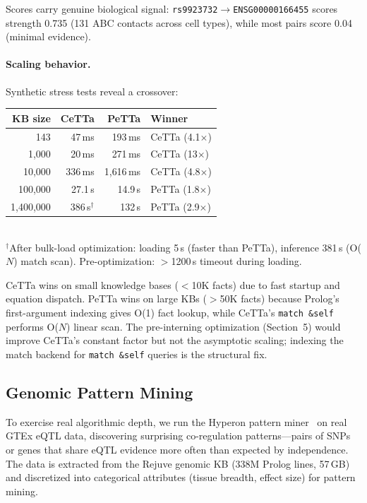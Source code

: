 \documentclass[11pt]{article}
\newcommand{\code}[1]{\texttt{#1}}
\newcommand{\PeTTa}{\textup{PeTTa}}
\newcommand{\CeTTa}{\textup{CeTTa}}
\begin{document}
Scores carry genuine biological signal: \code{rs9923732}$\to$\code{ENSG00000166455}
scores strength 0.735 (131 ABC contacts across cell types), while
most pairs score 0.04 (minimal evidence).

\paragraph{Scaling behavior.}
Synthetic stress tests reveal a crossover:

\begin{center}
\begin{tabular}{rrrl}
\toprule
KB size & \CeTTa{} & \PeTTa{} & Winner \\
\midrule
143        & 47\,ms    & 193\,ms   & \CeTTa{} (4.1$\times$) \\
1{,}000    & 20\,ms    & 271\,ms   & \CeTTa{} (13$\times$) \\
10{,}000   & 336\,ms   & 1{,}616\,ms & \CeTTa{} (4.8$\times$) \\
100{,}000  & 27.1\,s   & 14.9\,s   & \PeTTa{} (1.8$\times$) \\
1{,}400{,}000 & 386\,s$^\dagger$ & 132\,s & \PeTTa{} (2.9$\times$) \\
\bottomrule
\end{tabular}
\smallskip\\
{\footnotesize $^\dagger$After bulk-load optimization: loading 5\,s
(faster than \PeTTa{}), inference 381\,s (O($N$) match scan).
Pre-optimization: $>$1200\,s timeout during loading.}
\end{center}

\CeTTa{} wins on small knowledge bases ($<$10K facts) due to fast
startup and equation dispatch.  \PeTTa{} wins on large KBs
($>$50K facts) because Prolog's first-argument indexing gives O(1)
fact lookup, while \CeTTa{}'s \code{match~\&self} performs O($N$)
linear scan.  The pre-interning optimization (Section~5) would
improve \CeTTa{}'s constant factor but not the asymptotic scaling;
indexing the match backend for \code{match~\&self} queries is the
structural fix.

\subsection{Genomic Pattern Mining}

To exercise real algorithmic depth, we run the Hyperon pattern
miner~\cite{metta} on real GTEx eQTL data, discovering surprising
co-regulation patterns---pairs of SNPs or genes that share eQTL
evidence more often than expected by independence.  The data is
extracted from the Rejuve genomic KB (338M Prolog lines, 57\,GB)
and discretized into categorical attributes (tissue breadth, effect
size) for pattern mining.
\end{document}
